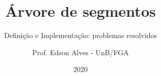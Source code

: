 \title{Árvore de segmentos}
\subtitle{Definição e Implementação: problemas resolvidos}
\author{Prof. Edson Alves - UnB/FGA}
\date{2020}
